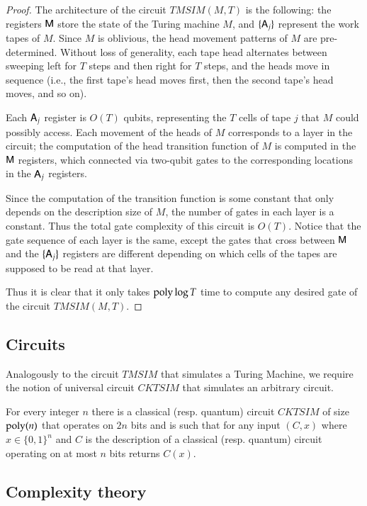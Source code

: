 \begin{proof}
	The architecture of the circuit $TMSIM(M,T)$ is the following: the registers ${\mathsf{M}}$ store the state of the Turing machine $M$, and $\{{\mathsf{A}}_j\}$ represent the work tapes of $M$. Since $M$ is oblivious, the head movement patterns of $M$ are pre-determined. Without loss of generality, each tape head alternates between sweeping left for $T$ steps and then right for $T$ steps, and the heads move in sequence (i.e., the first tape's head moves first, then the second tape's head moves, and so on). 
	
	Each ${\mathsf{A}}_j$ register is $O(T)$ qubits, representing the $T$ cells of tape $j$ that $M$ could possibly access. Each movement of the heads of $M$ corresponds to a layer in the circuit; the computation of the head transition function of $M$ is computed in the ${\mathsf{M}}$ registers, which connected via two-qubit gates to the corresponding locations in the ${\mathsf{A}}_j$ registers. 
	
	Since the computation of the transition function is some constant that only depends on the description size of $M$, the number of gates in each layer is a constant. Thus the total gate complexity of this circuit is $O(T)$. Notice that the gate sequence of each layer is the same, except the gates that cross between ${\mathsf{M}}$ and the $\{{\mathsf{A}}_j\}$ registers are different depending on which cells of the tapes are supposed to be read at that layer. 
	
	Thus it is clear that it only takes $\operatorname{poly}\log T$ time to compute any desired gate of the circuit $TMSIM(M,T)$.
\end{proof}

\subsection{Circuits}

Analogously to the circuit $TMSIM$ that simulates a Turing Machine, we require the notion of universal circuit $CKTSIM$ that simulates an arbitrary circuit. 

\begin{lemma}\label{lem:cktsim}
For every integer $n$ there is a classical (resp. quantum) circuit $CKTSIM$ of size $\operatorname{poly}(n)$ that operates on $2n$ bits and is such that for any input $(C,x)$ where $x\in\{0,1\}^n$ and $C$ is the description of a classical (resp. quantum) circuit operating on at most $n$ bits returns $C(x)$. 
\end{lemma}

\subsection{Complexity theory}

